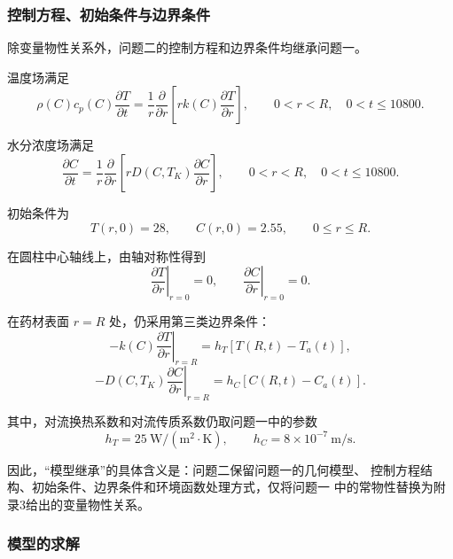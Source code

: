 \documentclass[12pt,a4paper]{article}
\renewcommand{\boxed}[1]{#1}
\begin{document}
\subsubsection{控制方程、初始条件与边界条件}

除变量物性关系外，问题二的控制方程和边界条件均继承问题一。

温度场满足
\begin{equation}
\boxed{
\rho(C)c_p(C)\frac{\partial T}{\partial t}
=
\frac{1}{r}
\frac{\partial}{\partial r}
\left[
r k(C)\frac{\partial T}{\partial r}
\right]
},
\qquad
0<r<R,\quad 0<t\leq10800.
\end{equation}

水分浓度场满足
\begin{equation}
\boxed{
\frac{\partial C}{\partial t}
=
\frac{1}{r}
\frac{\partial}{\partial r}
\left[
rD(C,T_K)\frac{\partial C}{\partial r}
\right]
},
\qquad
0<r<R,\quad 0<t\leq10800.
\end{equation}

初始条件为
\begin{equation}
\boxed{
T(r,0)=28,\qquad C(r,0)=2.55
},
\qquad
0\leq r\leq R.
\end{equation}

在圆柱中心轴线上，由轴对称性得到
\begin{equation}
\boxed{
\left.\frac{\partial T}{\partial r}\right|_{r=0}=0,\qquad
\left.\frac{\partial C}{\partial r}\right|_{r=0}=0
}.
\end{equation}

在药材表面 $r=R$ 处，仍采用第三类边界条件：
\begin{equation}
\boxed{
-k(C)\left.\frac{\partial T}{\partial r}\right|_{r=R}
=
h_T\left[T(R,t)-T_a(t)\right]
},
\end{equation}
\begin{equation}
\boxed{
-D(C,T_K)\left.\frac{\partial C}{\partial r}\right|_{r=R}
=
h_C\left[C(R,t)-C_a(t)\right]
}.
\end{equation}

其中，对流换热系数和对流传质系数仍取问题一中的参数
\begin{equation}
h_T=25\ \mathrm{W/(m^2\cdot K)},\qquad
h_C=8\times10^{-7}\ \mathrm{m/s}.
\end{equation}

因此，“模型继承”的具体含义是：问题二保留问题一的几何模型、
控制方程结构、初始条件、边界条件和环境函数处理方式，仅将问题一
中的常物性替换为附录3给出的变量物性关系。

\subsubsection{模型的求解}
\end{document}

